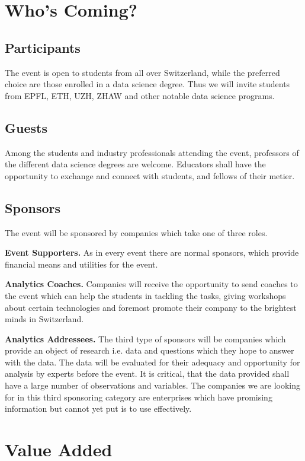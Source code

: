 \documentclass[11pt,a4paper,notitlepage]{article}
\begin{document}
\section*{Who’s Coming?}
\subsection*{Participants}
The event is open to students from all over Switzerland, while the preferred choice are those enrolled in a data science degree. Thus we will invite students from EPFL, ETH, UZH, ZHAW and other notable data science programs.

\subsection*{Guests}
Among the students and industry professionals attending the event, professors of the different data science degrees are welcome. Educators shall have the opportunity to exchange and connect with students, and fellows of their metier.

\subsection*{Sponsors}
The event will be sponsored by companies which take one of three roles. 

\textbf{Event Supporters.} As in every event there are normal sponsors, which provide financial means and utilities for the event. 

\textbf{Analytics Coaches.} Companies will receive the opportunity to send coaches to the event which can help the students in tackling the tasks, giving workshops about certain technologies and foremost promote their company to the brightest minds in Switzerland.

\textbf{Analytics Addressees.} The third type of sponsors will be companies which provide an object of research i.e. data and questions which they hope to answer with the data. The data will be evaluated for their adequacy and opportunity for analysis by experts before the event. It is critical, that the data provided shall have a large number of observations and variables. The companies we are looking for in this third sponsoring category are enterprises which have promising information but cannot yet put is to use effectively.

\section*{Value Added}
\end{document}
